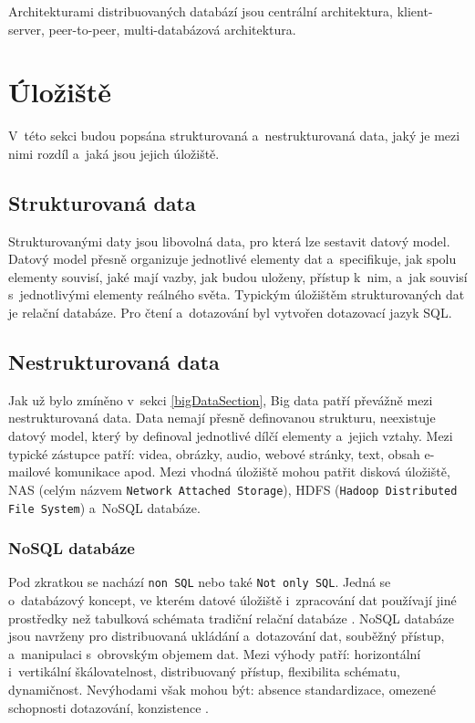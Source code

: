 \vspace{0.5cm}
\noindent Architekturami distribuovaných databází jsou centrální architektura, klient-server, peer-to-peer, multi-databázová architektura.

\section{Úložiště}
V~této sekci budou popsána strukturovaná a~nestrukturovaná data, jaký je mezi nimi rozdíl a~jaká jsou jejich úložiště.

\subsection{Strukturovaná data}
Strukturovanými daty jsou libovolná data, pro která lze sestavit datový model. Datový model přesně organizuje jednotlivé elementy dat a~specifikuje, jak spolu elementy souvisí, jaké mají vazby, jak budou uloženy, přístup k~nim, a~jak souvisí s~jednotlivými elementy reálného světa. \cite{structData} Typickým úložištěm strukturovaných dat je relační databáze. Pro čtení a~dotazování byl vytvořen dotazovací jazyk SQL.

\subsection{Nestrukturovaná data}
Jak už bylo zmíněno v~sekci \ref{bigDataSection}, Big data patří převážně mezi nestrukturovaná data. Data nemají přesně definovanou strukturu, neexistuje datový model, který by definoval jednotlivé dílčí elementy a~jejich vztahy. Mezi typické zástupce patří: videa, obrázky, audio, webové stránky, text, obsah e-mailové komunikace apod. Mezi vhodná úložiště mohou patřit disková úložiště, NAS (celým názvem \texttt{Network Attached Storage}), HDFS (\texttt{Hadoop Distributed File System}) a~NoSQL databáze.

\subsubsection{NoSQL databáze}
Pod zkratkou se nachází \texttt{non SQL} nebo také \texttt{Not only SQL}. Jedná se o~databázový koncept, ve kterém datové úložiště i~zpracování dat používají jiné prostředky než tabulková schémata tradiční relační databáze \cite{noSqlWiki}. NoSQL databáze jsou navrženy pro distribuovaná ukládání a~dotazování dat, souběžný přístup, a~manipulaci s~obrovským objemem dat. Mezi výhody patří: horizontální i~vertikální škálovatelnost, distribuovaný přístup, flexibilita schématu, dynamičnost. Nevýhodami však mohou být: absence standardizace, omezené schopnosti dotazování, konzistence \cite{noSqlIntro}.


